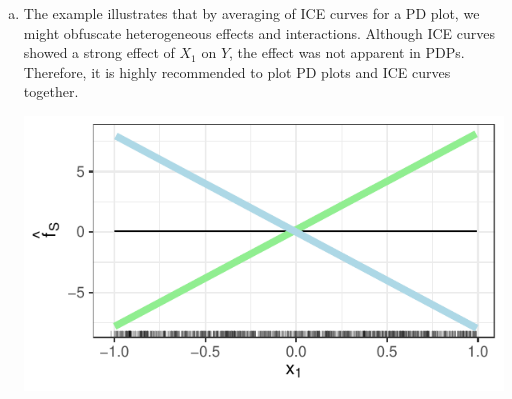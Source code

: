 {\begin{enumerate} [a)]
  The light green dots correspond to group $X_2 = 1$, the light blue dots to group $X_2 = 0$.
  
   \item The example illustrates that by averaging of ICE curves for a PD plot, 
   we might obfuscate heterogeneous effects and interactions. 
   Although ICE curves showed a strong effect of $X_1$ on $Y$, the effect was not 
   apparent in PDPs.
   Therefore, it is highly recommended to plot PD plots and ICE curves together. 

\begin{center}
  \includegraphics[width=\maxwidth]{figure/pdpinteraction_ICE_curve_sol.pdf}
\end{center}

  
\end{enumerate}
}